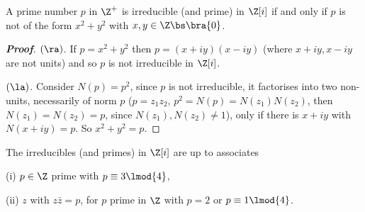 \begin{lemma}\label{lem:square_modulo}
A prime number $p$ in $\Z^+$ is irreducible (and prime) in $\Z[i]$ if and only if $p$ is not of the form $x^2 + y^2$ with $x, y \in \Z \bs \bra{0}$.
\end{lemma}

\begin{proof}[\bf Proof]
$(\ra)$. If $p = x^2 + y^2$ then $p = (x + iy)(x - iy)$ (where $x+iy,x-iy$ are not units) and so $p$ is not irreducible in $\Z[i]$.

$(\la)$. Consider $N(p) = p^2$, since $p$ is not irreducible, it factorises into two non-units, necessarily of norm $p$ ($p = z_1z_2$, $p^2 = N(p) = N(z_1)N(z_2)$, then $N(z_1) = N(z_2) = p$, since $N(z_1),N(z_2)\neq 1$), only if there is $x + iy$ with $N(x + iy) = p$. So $x^2 + y^2 = p$.
\end{proof}


\begin{proposition}\label{pro:irreducible_associate_prime_p}
The irreducibles (and primes) in $\Z[i]$ are up to associates
\ben
\item [(i)] $p \in \Z$ prime with $p \equiv 3 \lmod{4}$,
\item [(ii)] $z$ with $z\bar{z} = p$, for $p$ prime in $\Z$ with $p = 2$ or $p \equiv 1 \lmod{4}$.
\een
\end{proposition}


